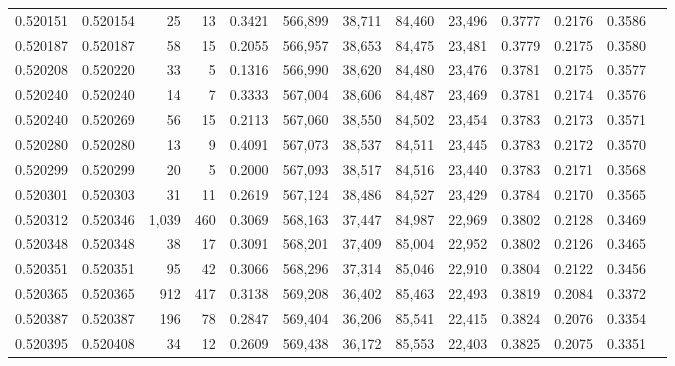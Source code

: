 \begin{tabular}{rrrrrrrrrrrrr}
0.520151 & 0.520154 &    25 &    13 &                                     0.3421 & 566,899 &  38,711 &  84,460 &  23,496 & 0.3777 & 0.2176 & 0.3586 \\
0.520187 & 0.520187 &    58 &    15 &                                     0.2055 & 566,957 &  38,653 &  84,475 &  23,481 & 0.3779 & 0.2175 & 0.3580 \\
0.520208 & 0.520220 &    33 &     5 &                                     0.1316 & 566,990 &  38,620 &  84,480 &  23,476 & 0.3781 & 0.2175 & 0.3577 \\
0.520240 & 0.520240 &    14 &     7 &                                     0.3333 & 567,004 &  38,606 &  84,487 &  23,469 & 0.3781 & 0.2174 & 0.3576 \\
0.520240 & 0.520269 &    56 &    15 &                                     0.2113 & 567,060 &  38,550 &  84,502 &  23,454 & 0.3783 & 0.2173 & 0.3571 \\
0.520280 & 0.520280 &    13 &     9 &                                     0.4091 & 567,073 &  38,537 &  84,511 &  23,445 & 0.3783 & 0.2172 & 0.3570 \\
0.520299 & 0.520299 &    20 &     5 &                                     0.2000 & 567,093 &  38,517 &  84,516 &  23,440 & 0.3783 & 0.2171 & 0.3568 \\
0.520301 & 0.520303 &    31 &    11 &                                     0.2619 & 567,124 &  38,486 &  84,527 &  23,429 & 0.3784 & 0.2170 & 0.3565 \\
0.520312 & 0.520346 & 1,039 &   460 &                                     0.3069 & 568,163 &  37,447 &  84,987 &  22,969 & 0.3802 & 0.2128 & 0.3469 \\
0.520348 & 0.520348 &    38 &    17 &                                     0.3091 & 568,201 &  37,409 &  85,004 &  22,952 & 0.3802 & 0.2126 & 0.3465 \\
0.520351 & 0.520351 &    95 &    42 &                                     0.3066 & 568,296 &  37,314 &  85,046 &  22,910 & 0.3804 & 0.2122 & 0.3456 \\
0.520365 & 0.520365 &   912 &   417 &                                     0.3138 & 569,208 &  36,402 &  85,463 &  22,493 & 0.3819 & 0.2084 & 0.3372 \\
0.520387 & 0.520387 &   196 &    78 &                                     0.2847 & 569,404 &  36,206 &  85,541 &  22,415 & 0.3824 & 0.2076 & 0.3354 \\
0.520395 & 0.520408 &    34 &    12 &                                     0.2609 & 569,438 &  36,172 &  85,553 &  22,403 & 0.3825 & 0.2075 & 0.3351 \\

\end{tabular}
